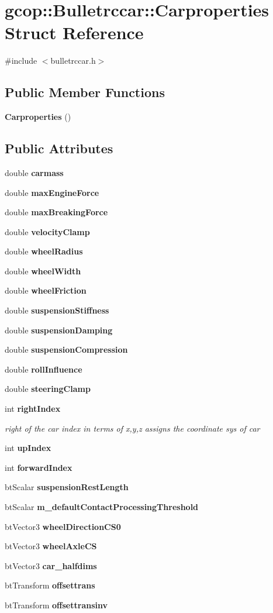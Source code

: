 \section{gcop\-:\-:\-Bulletrccar\-:\-:\-Carproperties \-Struct \-Reference}
\label{structgcop_1_1Bulletrccar_1_1Carproperties}


{\ttfamily \#include $<$bulletrccar.\-h$>$}

\subsection*{\-Public \-Member \-Functions}
\begin{DoxyCompactItemize}
\item 
{\bf \-Carproperties} ()
\end{DoxyCompactItemize}
\subsection*{\-Public \-Attributes}
\begin{DoxyCompactItemize}
\item 
double {\bf carmass}
\item 
double {\bf max\-Engine\-Force}
\item 
double {\bf max\-Breaking\-Force}
\item 
double {\bf velocity\-Clamp}
\item 
double {\bf wheel\-Radius}
\item 
double {\bf wheel\-Width}
\item 
double {\bf wheel\-Friction}
\item 
double {\bf suspension\-Stiffness}
\item 
double {\bf suspension\-Damping}
\item 
double {\bf suspension\-Compression}
\item 
double {\bf roll\-Influence}
\item 
double {\bf steering\-Clamp}
\item 
int {\bf right\-Index}
\begin{DoxyCompactList}\small\item\em right of the car index in terms of x,y,z assigns the coordinate sys of car \end{DoxyCompactList}\item 
int {\bf up\-Index}
\item 
int {\bf forward\-Index}
\item 
bt\-Scalar {\bf suspension\-Rest\-Length}
\item 
bt\-Scalar {\bf m\-\_\-default\-Contact\-Processing\-Threshold}
\item 
bt\-Vector3 {\bf wheel\-Direction\-C\-S0}
\item 
bt\-Vector3 {\bf wheel\-Axle\-C\-S}
\item 
bt\-Vector3 {\bf car\-\_\-halfdims}
\item 
bt\-Transform {\bf offsettrans}
\item 
bt\-Transform {\bf offsettransinv}
\end{DoxyCompactItemize}


